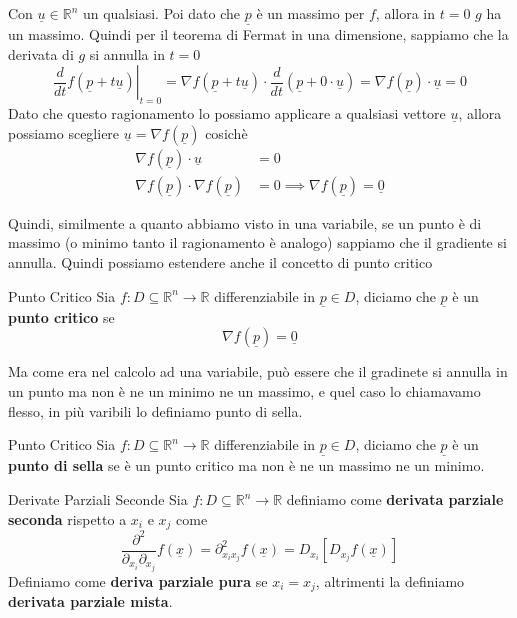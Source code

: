 \documentclass{rapport}
\begin{document}
Con $\underline{u}\in\mathbb{R}^n$ un qualsiasi. Poi dato che $\underline{p}$ è un massimo per $f$, allora in $t=0$ $g$ ha un massimo. Quindi per il teorema di Fermat in una dimensione, sappiamo che la derivata di $g$ si annulla in $t=0$
\[
\left.\dfrac{d}{dt}f(\underline{p} + t\underline{u}) \right|_{t=0} = \nabla f(\underline{p} + t\underline{u}) \cdot \dfrac{d}{dt} (\underline{p} + 0\cdot \underline{u}) =\nabla f(\underline{p} ) \cdot \underline{u} = 0  
\]  
Dato che questo ragionamento lo possiamo applicare a qualsiasi vettore $\underline{u}$, allora possiamo scegliere $\underline{u} = \nabla f(\underline{p})$ cosichè
\begin{align*}
  \nabla f(\underline{p} ) \cdot \underline{u} &= 0 \\
  \nabla f(\underline{p} ) \cdot  \nabla f(\underline{p} ) &= 0 \implies \nabla f(\underline{p} ) = \underline{0}
\end{align*}

Quindi, similmente a quanto abbiamo visto in una variabile, se un punto è di massimo (o minimo tanto il ragionamento è analogo) sappiamo che il gradiente si annulla. Quindi possiamo estendere anche il concetto di punto critico
\begin{definizione}{Punto Critico}{}
  Sia $f:D\subseteq\mathbb{R}^n\to \mathbb{R}$ differenziabile in $\underline{p} \in D$, diciamo che $\underline{p}$ è un \textbf{punto critico} se 
  \[
  \nabla f(\underline{p})  = \underline{0}
  \]
\end{definizione}

Ma come era nel calcolo ad una variabile, può essere che il gradinete si annulla in un punto ma non è ne un minimo ne un massimo, e quel caso lo chiamavamo flesso, in più varibili lo definiamo punto di sella.
\begin{definizione}{Punto Critico}{}
  Sia $f:D\subseteq\mathbb{R}^n\to \mathbb{R}$ differenziabile in $\underline{p} \in D$, diciamo che $\underline{p}$ è un \textbf{punto di sella} se è un punto critico ma non è ne un massimo ne un minimo.
\end{definizione}

\newpage
\begin{definizione}{Derivate Parziali Seconde}{}
   Sia $f:D\subseteq\mathbb{R}^n\to \mathbb{R}$ definiamo come \textbf{derivata parziale seconda} rispetto a $x_i$ e $x_j$ come 
   \[
   \dfrac{\partial^2}{\partial_{x_i} \partial_{x_j}} f(\underline{x}) = \partial^2_{x_ix_j} f(\underline{x}) = D_{x_i} \left[D_{x_j} f(\underline{x})\right]
   \] 
   Definiamo come \textbf{deriva parziale pura} se $x_i = x_j$, altrimenti la definiamo \textbf{derivata parziale mista}.
\end{definizione}
\end{document}
